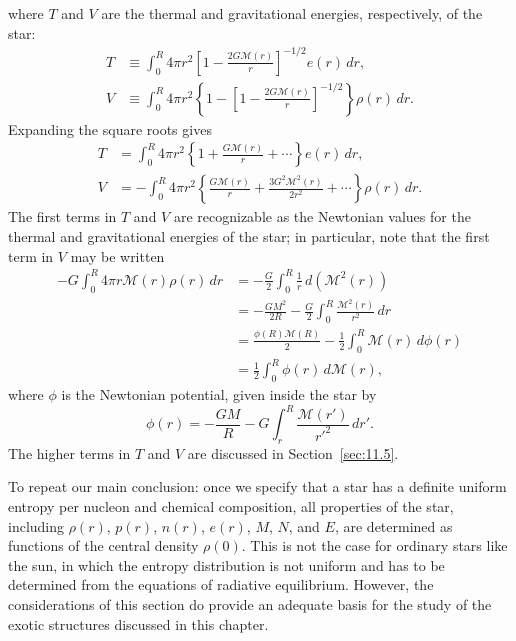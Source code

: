 where \(T\) and \(V\) are the thermal and gravitational energies,
respectively, of the star:
\begin{align}
  T
  &\equiv
  \int_0^R4\pi r^2
  \left[1-\frac{2G\mathcal{M}(r)}r\right]^{-1/2}
  e(r)\,dr,
  \tag{11.1.27}\label{eq:11.1.27}\\
  V
  &\equiv
  \int_0^R4\pi r^2
  \left\{
    1-\left[1-\frac{2G\mathcal{M}(r)}r\right]^{-1/2}
  \right\}
  \rho(r)\,dr.
  \tag{11.1.28}\label{eq:11.1.28}
\end{align}
Expanding the square roots gives
\begin{align}
  T
  &=
  \int_0^R4\pi r^2
  \left\{1+\frac{G\mathcal{M}(r)}r+\cdots\right\}
  e(r)\,dr,
  \tag{11.1.29}\label{eq:11.1.29}\\
  V
  &=
  -\int_0^R4\pi r^2
  \left\{
    \frac{G\mathcal{M}(r)}r
    +\frac{3G^2\mathcal{M}^2(r)}{2r^2}
    +\cdots
  \right\}\rho(r)\,dr.
  \tag{11.1.30}\label{eq:11.1.30}
\end{align}
The first terms in \(T\) and \(V\) are recognizable as the Newtonian values
for the thermal and gravitational energies of the star; in particular, note
that the first term in \(V\) may be written
\begin{equation}
  \begin{aligned}
  -G\int_0^R4\pi r\mathcal{M}(r)\rho(r)\,dr
  &=-\frac G2\int_0^R\frac1r\,d\!\left(\mathcal{M}^2(r)\right)\\
  &=-\frac{GM^2}{2R}
    -\frac G2\int_0^R\frac{\mathcal{M}^2(r)}{r^2}\,dr\\
  &=\frac{\phi(R)\mathcal{M}(R)}2
    -\frac12\int_0^R\mathcal{M}(r)\,d\phi(r)\\
  &=\frac12\int_0^R\phi(r)\,d\mathcal{M}(r),
  \end{aligned}
  \tag{11.1.31}\label{eq:11.1.31}
\end{equation}
where \(\phi\) is the Newtonian potential, given inside the star by
\[
  \phi(r)=-\frac{GM}{R}
  -G\int_r^R\frac{\mathcal{M}(r')}{r'^2}\,dr'.
\]
The higher terms in \(T\) and \(V\) are discussed in
Section~\ref{sec:11.5}.

To repeat our main conclusion: once we specify that a star has a definite
uniform entropy per nucleon and chemical composition, all properties of the
star, including \(\rho(r)\), \(p(r)\), \(n(r)\), \(e(r)\), \(M\), \(N\), and
\(E\), are determined as functions of the central density \(\rho(0)\). This is
not the case for ordinary stars like the sun, in which the entropy distribution
is not uniform and has to be determined from the equations of radiative
equilibrium. However, the considerations of this section do provide an
adequate basis for the study of the exotic structures discussed in this
chapter.
